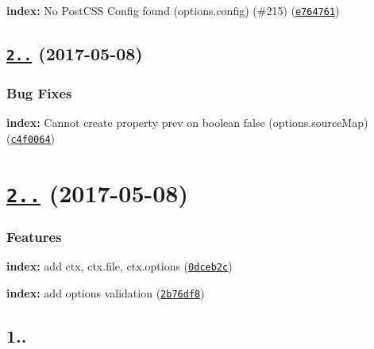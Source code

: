 \begin{DoxyItemize}
\item {\bfseries index\+:} \textquotesingle{}No Post\+C\+SS Config found\textquotesingle{} ({\ttfamily options.\+config}) (\#215) (\href{https://github.com/postcss/postcss-loader/commit/e764761}{\tt e764761})
\end{DoxyItemize}

\label{_2.0.1}%
 \subsection*{\href{https://github.com/postcss/postcss-loader/compare/v2.0.0...v2.0.1}{\tt 2..} (2017-\/05-\/08)}

\subsubsection*{Bug Fixes}


\begin{DoxyItemize}
\item {\bfseries index\+:} \textquotesingle{}Cannot create property {\ttfamily prev} on boolean {\ttfamily false}\textquotesingle{} ({\ttfamily options.\+source\+Map}) (\href{https://github.com/postcss/postcss-loader/commit/c4f0064}{\tt c4f0064})
\end{DoxyItemize}

\label{_2.0.0}%
 \section*{\href{https://github.com/postcss/postcss-loader/compare/1.2.2...v2.0.0}{\tt 2..} (2017-\/05-\/08)}

\subsubsection*{Features}


\begin{DoxyItemize}
\item {\bfseries index\+:} add ctx, ctx.\+file, ctx.\+options (\href{https://github.com/postcss/postcss-loader/commit/0dceb2c}{\tt 0dceb2c})
\item {\bfseries index\+:} add options validation (\href{https://github.com/postcss/postcss-loader/commit/2b76df8}{\tt 2b76df8})
\end{DoxyItemize}

\subsection*{1..}


